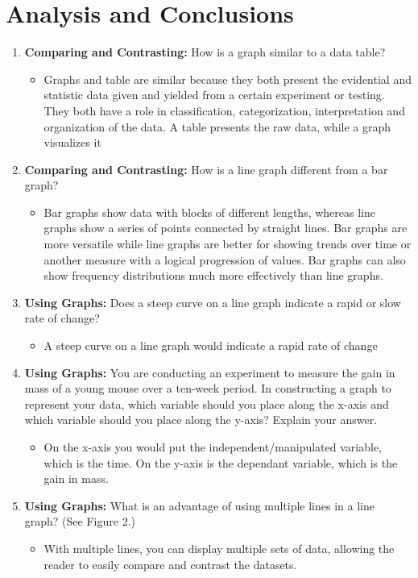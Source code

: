 \documentclass{scrartcl}
\begin{document}
\section{Analysis and Conclusions}
\label{sec:org7f9a7f8}
\begin{enumerate}
\item \textbf{Comparing and Contrasting:} How is a graph similar to a data table?
\begin{itemize}
\item Graphs and table are similar because they both present the evidential and
statistic data given and yielded from a certain experiment or testing. They
both have a role in classification, categorization, interpretation and
organization of the data. A table presents the raw data, while a graph
visualizes it
\end{itemize}

\item \textbf{Comparing and Contrasting:} How is a line graph different from a bar graph?
\begin{itemize}
\item Bar graphs show data with blocks of different lengths, whereas line graphs
show a series of points connected by straight lines. Bar graphs are more
versatile while line graphs are better for showing trends over time or
another measure with a logical progression of values. Bar graphs can also
show frequency distributions much more effectively than line graphs.
\end{itemize}

\item \textbf{Using Graphs:} Does a steep curve on a line graph indicate a rapid or slow
rate of change?
\begin{itemize}
\item A steep curve on a line graph would indicate a rapid rate of change
\end{itemize}

\item \textbf{Using Graphs:} You are conducting an experiment to measure the gain in mass of
a young mouse over a ten-week period. In constructing a graph to represent
your data, which variable should you place along the x-axis and which
variable should you place along the y-axis? Explain your answer.
\begin{itemize}
\item On the x-axis you would put the independent/manipulated variable, which is
the time. On the y-axis is the dependant variable, which is the gain in
mass.
\end{itemize}

\item \textbf{Using Graphs:} What is an advantage of using multiple lines in a line graph?
(See Figure 2.)
\begin{itemize}
\item With multiple lines, you can display multiple sets of data, allowing the
reader to easily compare and contrast the datasets.
\end{itemize}
\end{enumerate}
\end{document}

